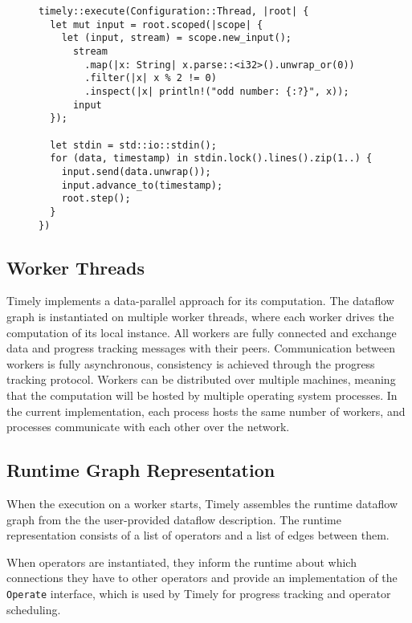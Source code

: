 \begin{figure}
\begin{lstlisting}[caption={[Example program in Timely Dataflow.]A simple 
single-threaded example program which reads lines from standard input,
converts them into integers and filters out odd numbers.}]
timely::execute(Configuration::Thread, |root| {
  let mut input = root.scoped(|scope| {
    let (input, stream) = scope.new_input();
      stream
        .map(|x: String| x.parse::<i32>().unwrap_or(0))
        .filter(|x| x % 2 != 0)
        .inspect(|x| println!("odd number: {:?}", x));
      input
  });

  let stdin = std::io::stdin();
  for (data, timestamp) in stdin.lock().lines().zip(1..) {
    input.send(data.unwrap());
    input.advance_to(timestamp);
    root.step();
  }
})
\end{lstlisting}
\end{figure}

\subsection{Worker Threads}

Timely implements a data-parallel approach for its computation. The dataflow graph
is instantiated on multiple worker threads, where each worker
drives the computation of its local instance. All workers are fully connected
and exchange data and progress tracking messages with their peers. Communication
between workers is fully asynchronous, consistency is achieved through the
progress tracking protocol. Workers can be distributed over multiple
machines, meaning that the computation will be hosted by multiple operating
system processes.
In the current implementation, each process hosts the same number of
workers, and processes communicate with each other over the network.

\subsection{Runtime Graph Representation} \label{sec:runtime-graph}

When the execution on a worker starts, Timely assembles the runtime
dataflow graph from the the user-provided dataflow description. The runtime
representation consists of a list of operators and a list of edges between them.

When operators are instantiated, they inform the runtime about which
connections they have to other operators and provide an implementation
of the \lstinline{Operate} interface, which is used by Timely for progress
tracking and operator scheduling.

